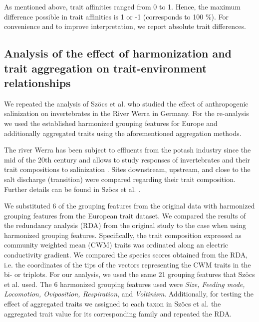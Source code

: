 \documentclass{article}
\begin{document}
As mentioned above, trait affinities ranged from 0 to 1. Hence, the maximum difference possible in trait affinities is 1 or -1 (corresponds to 100 \%). For convenience and to improve interpretation, we report absolute trait differences.


\subsection*{Analysis of the effect of harmonization and trait aggregation on trait-environment relationships}

We repeated the analysis of Szöcs et al. \cite{szocs_effects_2014} who studied the effect of anthropogenic salinization on invertebrates in the River Werra in Germany. For the re-analysis we used the established harmonized grouping features for Europe and additionally aggregated traits using the aforementioned aggregation methods. 

The river Werra has been subject to effluents from the potash industry since the mid of the 20th century and allows to study responses of invertebrates and their trait compositions to salinization \cite{bathe_biological_2011}. Sites downstream, upstream, and close to the salt discharge (transition) were compared regarding their trait composition. Further details can be found in Szöcs et al. \cite{szocs_effects_2014}. 

We substituted 6 of the grouping features from the original data with harmonized grouping features from the European trait dataset. We compared the results of the redundancy analysis (RDA) from the original study to the case when using harmonized grouping features. Specifically, the trait composition expressed as community weighted mean (CWM) traits was ordinated along an electric conductivity gradient. We compared the species scores obtained from the RDA, i.e. the coordinates of the tips of the vectors representing the CWM traits in the bi- or triplots. For our analysis, we used the same 21 grouping features that Szöcs et al. \cite{szocs_effects_2014} used. The 6 harmonized grouping features used were \textit{Size, Feeding mode, Locomotion, Oviposition, Respiration}, and \textit{Voltinism}. Additionally, for testing the effect of aggregated traits we assigned to each taxon in Szöcs et al. \cite{szocs_effects_2014} the aggregated trait value for its corresponding family and repeated the RDA.  
\end{document}

